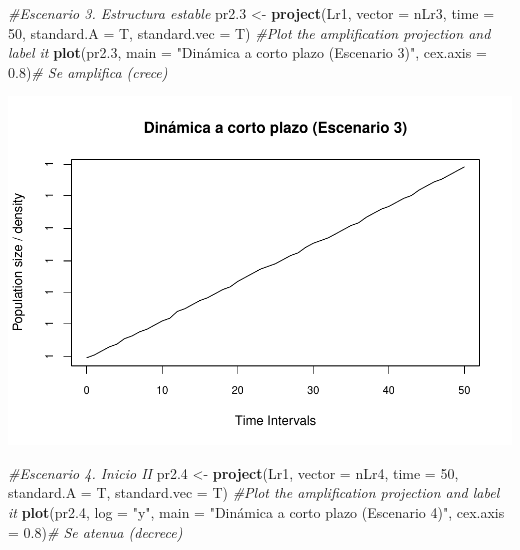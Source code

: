 \documentclass[
]{book}
\newenvironment{Shaded}{\begin{snugshade}}{\end{snugshade}}
\newcommand{\AttributeTok}[1]{\textcolor[rgb]{0.13,0.29,0.53}{#1}}
\newcommand{\CommentTok}[1]{\textcolor[rgb]{0.56,0.35,0.01}{\textit{#1}}}
\newcommand{\DecValTok}[1]{\textcolor[rgb]{0.00,0.00,0.81}{#1}}
\newcommand{\FloatTok}[1]{\textcolor[rgb]{0.00,0.00,0.81}{#1}}
\newcommand{\FunctionTok}[1]{\textcolor[rgb]{0.13,0.29,0.53}{\textbf{#1}}}
\newcommand{\NormalTok}[1]{#1}
\newcommand{\OtherTok}[1]{\textcolor[rgb]{0.56,0.35,0.01}{#1}}
\newcommand{\StringTok}[1]{\textcolor[rgb]{0.31,0.60,0.02}{#1}}
\theoremstyle{definition}
\theoremstyle{definition}
\theoremstyle{definition}
\theoremstyle{definition}
\theoremstyle{remark}
\begin{document}
\begin{Shaded}
\begin{Highlighting}[]
\CommentTok{\#Escenario 3. Estructura estable}
\NormalTok{pr2}\FloatTok{.3} \OtherTok{\textless{}{-}} \FunctionTok{project}\NormalTok{(Lr1, }\AttributeTok{vector =}\NormalTok{ nLr3, }\AttributeTok{time =} \DecValTok{50}\NormalTok{, }
                 \AttributeTok{standard.A =}\NormalTok{ T, }\AttributeTok{standard.vec =}\NormalTok{ T)}
\CommentTok{\#Plot the amplification projection and label it}
\FunctionTok{plot}\NormalTok{(pr2}\FloatTok{.3}\NormalTok{, }\AttributeTok{main =} \StringTok{"Dinámica a corto plazo (Escenario 3)"}\NormalTok{, }\AttributeTok{cex.axis =} \FloatTok{0.8}\NormalTok{)}\CommentTok{\# Se amplifica (crece)}
\end{Highlighting}
\end{Shaded}

\includegraphics{Diagnostico_Poblacional_files/figure-latex/chap10_5-3.pdf}

\begin{Shaded}
\begin{Highlighting}[]
\CommentTok{\#Escenario 4. Inicio II}
\NormalTok{pr2}\FloatTok{.4} \OtherTok{\textless{}{-}} \FunctionTok{project}\NormalTok{(Lr1, }\AttributeTok{vector =}\NormalTok{ nLr4, }\AttributeTok{time =} \DecValTok{50}\NormalTok{, }
                 \AttributeTok{standard.A =}\NormalTok{ T, }\AttributeTok{standard.vec =}\NormalTok{ T)}
\CommentTok{\#Plot the amplification projection and label it}
\FunctionTok{plot}\NormalTok{(pr2}\FloatTok{.4}\NormalTok{, }\AttributeTok{log =} \StringTok{"y"}\NormalTok{, }\AttributeTok{main =} \StringTok{"Dinámica a corto plazo (Escenario 4)"}\NormalTok{, }\AttributeTok{cex.axis =} \FloatTok{0.8}\NormalTok{)}\CommentTok{\# Se atenua (decrece)}
\end{Highlighting}
\end{Shaded}
\end{document}
